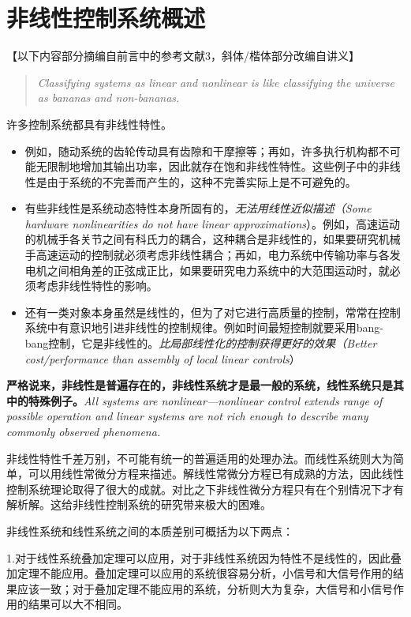 \section{非线性控制系统概述}
【以下内容部分摘编自前言中的参考文献3，斜体/楷体部分改编自讲义】
\begin{quote}
  \textit{Classifying systems as linear and nonlinear is like classifying the universe as bananas and non-bananas.}
\end{quote}
许多控制系统都具有非线性特性。
\begin{itemize}[leftmargin=2em]
  \item 例如，随动系统的齿轮传动具有齿隙和干摩擦等；再如，许多执行机构都不可能无限制地增加其输出功率，因此就存在饱和非线性特性。这些例子中的非线性是由于系统的不完善而产生的，这种不完善实际上是不可避免的。
  \item 有些非线性是系统动态特性本身所固有的，{\it 无法用线性近似描述（Some hardware nonlinearities do not have linear approximations}）。例如，高速运动的机械手各关节之间有科氏力的耦合，这种耦合是非线性的，如果要研究机械手高速运动的控制就必须考虑非线性耦合；再如，电力系统中传输功率与各发电机之间相角差的正弦成正比，如果要研究电力系统中的大范围运动时，就必须考虑非线性特性的影响。
  \item 还有一类对象本身虽然是线性的，但为了对它进行高质量的控制，常常在控制系统中有意识地引进非线性的控制规律。例如时间最短控制就要采用bang-bang控制，它是非线性的。{\it 比局部线性化的控制获得更好的效果（Better cost/performance than assembly of local linear controls}）
\end{itemize}

{\bf 严格说来，非线性是普遍存在的，非线性系统才是最一般的系统，线性系统只是其中的特殊例子。}{\it All systems are nonlinear---nonlinear control extends range of
possible operation and linear systems are not rich enough to describe many
commonly observed phenomena.}

非线性特性千差万别，不可能有统一的普遍适用的处理办法。而线性系统则大为简单，可以用线性常微分方程来描述。解线性常微分方程已有成熟的方法，因此线性控制系统理论取得了很大的成就。对比之下非线性微分方程只有在个别情况下才有解析解。这给非线性控制系统的研究带来极大的困难。

非线性系统和线性系统之间的本质差别可概括为以下两点：

1.对于线性系统叠加定理可以应用，对于非线性系统因为特性不是线性的，因此叠加定理不能应用。叠加定理可以应用的系统很容易分析，小信号和大信号作用的结果应该一致；对于叠加定理不能应用的系统，分析则大为复杂，大信号和小信号作用的结果可以大不相同。

